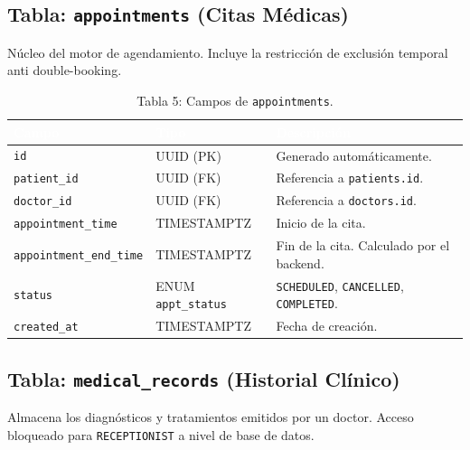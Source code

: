 \documentclass[a4paper,12pt]{article}
\renewcommand{\arraystretch}{1.1}
\begin{document}
\subsection{Tabla: \texttt{appointments} (Citas Médicas)}
Núcleo del motor de agendamiento. Incluye la restricción de exclusión temporal anti double-booking.

\begin{table}[H]
\centering\small\renewcommand{\arraystretch}{1.4}
\begin{tabular}{|p{3.8cm}|p{2.5cm}|p{7.2cm}|}
\hline
\rowcolor{SKTPrimary}
\textcolor{white}{\textbf{Campo}} & \textcolor{white}{\textbf{Tipo}} & \textcolor{white}{\textbf{Descripción}} \\
\hline
\texttt{id} & UUID (PK) & Generado automáticamente. \\
\hline
\texttt{patient\_id} & UUID (FK) & Referencia a \texttt{patients.id}. \\
\hline
\texttt{doctor\_id} & UUID (FK) & Referencia a \texttt{doctors.id}. \\
\hline
\texttt{appointment\_time} & TIMESTAMPTZ & Inicio de la cita. \\
\hline
\texttt{appointment\_end\_time} & TIMESTAMPTZ & Fin de la cita. Calculado por el backend. \\
\hline
\texttt{status} & ENUM \texttt{appt\_status} & \texttt{SCHEDULED}, \texttt{CANCELLED}, \texttt{COMPLETED}. \\
\hline
\texttt{created\_at} & TIMESTAMPTZ & Fecha de creación. \\
\hline
\end{tabular}
\caption*{Tabla 5: Campos de \texttt{appointments}.}
\end{table}

\subsection{Tabla: \texttt{medical\_records} (Historial Clínico)}
Almacena los diagnósticos y tratamientos emitidos por un doctor. Acceso bloqueado para \texttt{RECEPTIONIST} a nivel de base de datos.
\end{document}
